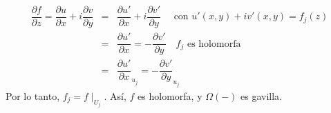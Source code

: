 \begin{ejp}
\begin{enumerate}
\begin{enumerate}
        \begin{eqnarray*}
            \dfrac{\partial f}{\partial z}=\dfrac{\partial u}{\partial x}+i\dfrac{\partial v}{\partial y}&=& \dfrac{\partial u'}{\partial x}+i\dfrac{\partial v'}{\partial y}\quad\text{ con }u'(x,y)+iv'(x,y)=f_j(z)\\
            &=& \dfrac{\partial u'}{\partial x}=-\dfrac{\partial v'}{\partial y} \quad f_j\text{ es holomorfa}\\
            &=& \dfrac{\partial u'}{\partial x}_{u_j}=-\dfrac{\partial v'}{\partial y}_{u_j}
        \end{eqnarray*}
        Por lo tanto, $f_j=f\mid_{U_j}$. Así, $f$ es holomorfa, y $\Omega(-)$ es gavilla.
        \end{enumerate}
\end{enumerate}
\end{ejp}
